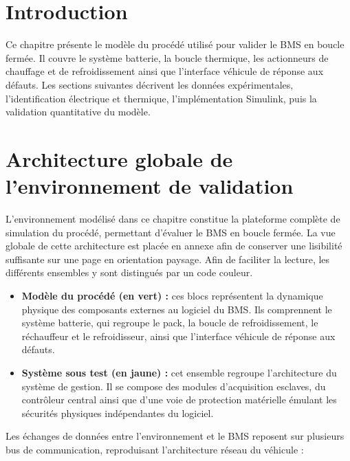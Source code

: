 \label{chap:modelisation_procede}

\section{Introduction}
\label{sec:ch3_introduction}

Ce chapitre présente le modèle du procédé utilisé pour valider le BMS en boucle fermée. Il couvre le système batterie, la boucle thermique, les actionneurs de chauffage et de refroidissement ainsi que l'interface véhicule de réponse aux défauts. Les sections suivantes décrivent les données expérimentales, l'identification électrique et thermique, l'implémentation Simulink, puis la validation quantitative du modèle.

\section{Architecture globale de l'environnement de validation}
\label{sec:ch3_architecture}

L'environnement modélisé dans ce chapitre constitue la plateforme complète de simulation du procédé, permettant d'évaluer le BMS en boucle fermée. La vue globale de cette architecture est placée en annexe afin de conserver une lisibilité suffisante sur une page en orientation paysage. Afin de faciliter la lecture, les différents ensembles y sont distingués par un code couleur.

\begin{itemize}
    \item \textbf{Modèle du procédé (en vert) :} ces blocs représentent la dynamique physique des composants externes au logiciel du BMS. Ils comprennent le système batterie, qui regroupe le pack, la boucle de refroidissement, le réchauffeur et le refroidisseur, ainsi que l'interface véhicule de réponse aux défauts.

    \item \textbf{Système sous test (en jaune) :} cet ensemble regroupe l'architecture du système de gestion. Il se compose des modules d'acquisition esclaves, du contrôleur central ainsi que d'une voie de protection matérielle émulant les sécurités physiques indépendantes du logiciel.
\end{itemize}

Les échanges de données entre l'environnement et le BMS reposent sur plusieurs bus de communication, reproduisant l'architecture réseau du véhicule :

